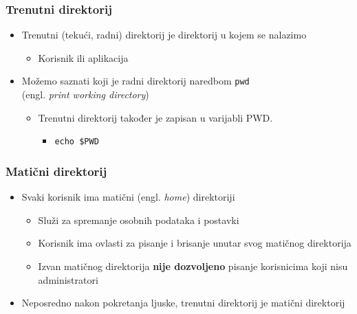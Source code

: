 \documentclass{beamer}
\newcommand{\shell}[1]{\texttt{#1}}
\begin{document}
\begin{frame}[t]
\frametitle{Trenutni direktorij}
\begin{itemize}
  \item Trenutni (tekući, radni) direktorij je direktorij u kojem se
        nalazimo
  \begin{itemize}
  	\item Korisnik ili aplikacija
  \end{itemize}
  	\item Možemo saznati koji je radni direktorij naredbom \texttt{pwd}
  		\\(engl. \emph{print working directory})
	\begin{itemize}
		\item Trenutni direktorij također je zapisan u varijabli PWD.
		\begin{itemize}
      		\item \shell{echo \$PWD}
      	\end{itemize}
	\end{itemize}
\end{itemize}
\end{frame}

\begin{frame}[t]
\frametitle{Matični direktorij}
\begin{itemize}
  \item Svaki korisnik ima matični (engl. \emph{home}) direktoriji
  \begin{itemize}
    \item Služi za spremanje osobnih podataka i postavki
    \item Korisnik ima ovlasti za pisanje i brisanje unutar svog matičnog
          direktorija
    \item Izvan matičnog direktorija \textbf{nije dozvoljeno} pisanje
          korisnicima koji nisu administratori
  \end{itemize}
  \item Neposredno nakon pokretanja ljuske, trenutni direktorij je matični
        direktorij
\end{itemize}
\end{frame}
\end{document}
